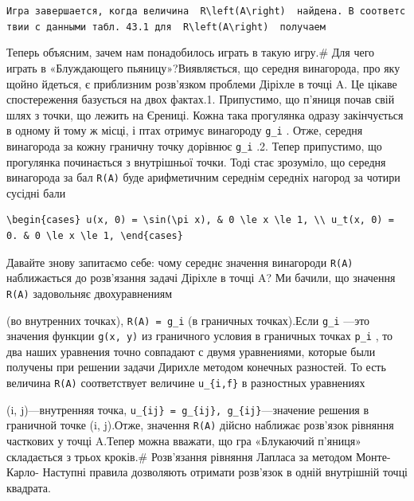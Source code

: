 \documentclass[
  ukrainian,
]{article}
\begin{document}
\texttt{Игра\ завершается,\ когда\ величина\ \ \textquotesingle{}R\textbackslash{}left(A\textbackslash{}right)\textquotesingle{}\ \ найдена.\ В\ соответствии\ с\ данными\ табл.\ 43.1\ для\ \ \textquotesingle{}R\textbackslash{}left(A\textbackslash{}right)\textquotesingle{}\ \ получаем}

Теперь объясним, зачем нам понадобилось играть в такую игру.\# Для чего
играть в «Блуждающего пьяницу»?Виявляється, що середня винагорода, про
яку щойно йдеться, є приблизним розв'язком проблеми Діріхле в точці A.
Це цікаве спостереження базується на двох фактах.1. Припустимо, що
п'яниця почав свій шлях з точки, що лежить на Єрениці. Кожна така
прогулянка одразу закінчується в одному й тому ж місці, і птах отримує
винагороду \texttt{g\_i} . Отже, середня винагорода за кожну граничну
точку дорівнює \texttt{g\_i} .2. Тепер припустимо, що прогулянка
починається з внутрішньої точки. Тоді стає зрозуміло, що середня
винагорода за бал \texttt{R(A)} буде арифметичним середнім середніх
нагород за чотири сусідні бали

\begin{verbatim}
\begin{cases} u(x, 0) = \sin(\pi x), & 0 \le x \le 1, \\ u_t(x, 0) = 0. & 0 \le x \le 1, \end{cases}
\end{verbatim}

Давайте знову запитаємо себе: чому середнє значення винагороди
\texttt{R(A)} наближається до розв'язання задачі Діріхле в точці A? Ми
бачили, що значення \texttt{R(A)} задовольняє двохуравнениям

(во внутренних точках), \texttt{R(A)\ =\ g\_i} (в граничных точках).Если
\texttt{g\_i} ---это значения функции \texttt{g(x,\ y)} из граничного
условия в граничных точках \texttt{p\_i} , то два наших уравнения точно
совпадают с двумя уравнениями, которые были получены при решении задачи
Дирихле методом конечных разностей. То есть величина \texttt{R(A)}
соответствует величине \texttt{u\_\{i,f\}} в разностных уравнениях

(i, j)---внутренняя точка,
\texttt{u\_\{ij\}\ =\ g\_\{ij\},\ g\_\{ij\}}---значение решения в
граничной точке (i, j).Отже, значення \texttt{R(A)} дійсно наближає
розв'язок рівняння часткових у точці A.Тепер можна вважати, що гра
«Блукаючий п'яниця» складається з трьох кроків.\# Розв'язання рівняння
Лапласа за методом Монте-Карло- Наступні правила дозволяють отримати
розв'язок в одній внутрішній точці квадрата.
\end{document}
